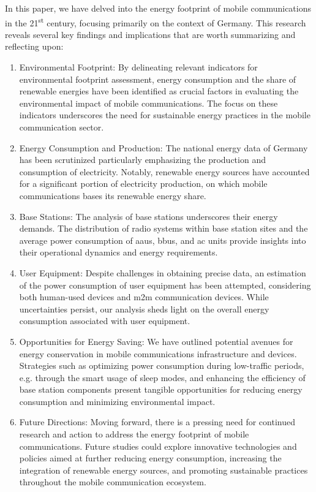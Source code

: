 \documentclass[11pt,a4paper]{article}
\begin{document}
In this paper, we have delved into the energy footprint of mobile communications in the 21\textsuperscript{st} century, focusing primarily on the context of Germany.
This research reveals several key findings and implications that are worth summarizing and reflecting upon:

\begin{enumerate}
  \item Environmental Footprint: By delineating relevant indicators for environmental footprint assessment, energy consumption and the share of renewable energies have been identified as crucial factors in evaluating the environmental impact of mobile communications.
  The focus on these indicators underscores the need for sustainable energy practices in the mobile communication sector.
  \item Energy Consumption and Production: The national energy data of Germany has been scrutinized  particularly emphasizing the production and consumption of electricity.
  Notably, renewable energy sources have accounted for a significant portion of electricity production, on which mobile communications bases its renewable energy share.
  \item Base Stations: The analysis of base stations underscores their energy demands.
  The distribution of radio systems within base station sites and the average power consumption of \acrshort{aau}s, \acrshort{bbu}s, and \acrshort{ac} units provide insights into their operational dynamics and energy requirements.
  \item User Equipment: Despite challenges in obtaining precise data, an estimation of the power consumption of user equipment has been attempted, considering both human-used devices and \acrshort{m2m} communication devices.
  While uncertainties persist, our analysis sheds light on the overall energy consumption associated with user equipment.
  \item Opportunities for Energy Saving: We have outlined potential avenues for energy conservation in mobile communications infrastructure and devices.
  Strategies such as optimizing power consumption during low-traffic periods, e.g. through the smart usage of sleep modes, and enhancing the efficiency of base station components present tangible opportunities for reducing energy consumption and minimizing environmental impact.
  \item Future Directions: Moving forward, there is a pressing need for continued research and action to address the energy footprint of mobile communications.
  Future studies could explore innovative technologies and policies aimed at further reducing energy consumption, increasing the integration of renewable energy sources, and promoting sustainable practices throughout the mobile communication ecosystem.
\end{enumerate}
\end{document}
